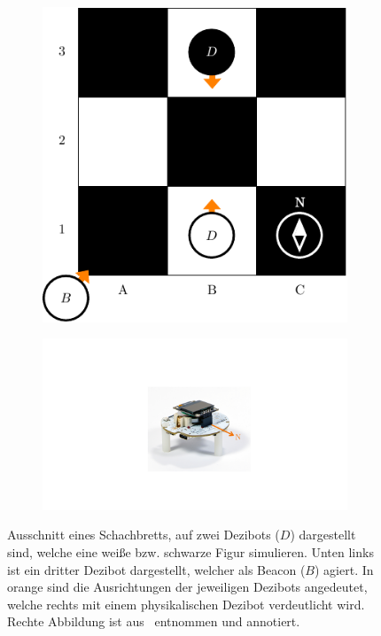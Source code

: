 \begin{figure}[h]
    \centering
    \begin{subfigure}[c]{0.5\textwidth}
        \includegraphics[width=\textwidth]{../assets/usage.drawio.pdf}
    \end{subfigure}
    \hspace{1em}
    \begin{subfigure}[c]{0.45\textwidth}
        \includegraphics[width=\textwidth]{../assets/dezibot_total_view_north.pdf}
    \end{subfigure}
    \caption{Ausschnitt eines Schachbretts, auf zwei Dezibots ($D$) dargestellt sind, welche eine weiße bzw. schwarze Figur simulieren. Unten links ist ein dritter Dezibot dargestellt, welcher als Beacon ($B$) agiert. In orange sind die Ausrichtungen der jeweiligen Dezibots angedeutet, welche rechts mit einem physikalischen Dezibot verdeutlicht wird. Rechte Abbildung ist aus~\cite{dezibotteamDezibotDezibot2025} entnommen und annotiert.}
    \label{fig:usage}
\end{figure}

